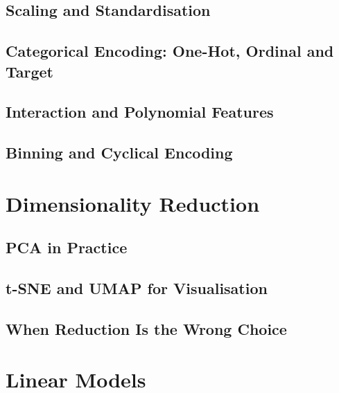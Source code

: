 \subsection{Scaling and Standardisation}

\subsection{Categorical Encoding: One-Hot, Ordinal and Target}

\subsection{Interaction and Polynomial Features}

\subsection{Binning and Cyclical Encoding}

\section{Dimensionality Reduction}
\label{sec:dimensionality-reduction}


\subsection{PCA in Practice}

\subsection{t-SNE and UMAP for Visualisation}

\subsection{When Reduction Is the Wrong Choice}

\section{Linear Models}
\label{sec:linear-models}

